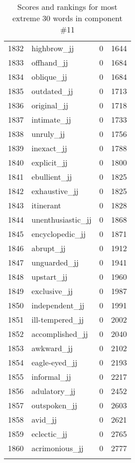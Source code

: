 \begin{longtable}[!htbp]{| rlr@{.}l |}
    1832 & highbrow\_jj & 0 & 1644 \\
    1833 & offhand\_jj & 0 & 1684 \\
    1834 & oblique\_jj & 0 & 1684 \\
    1835 & outdated\_jj & 0 & 1713 \\
    1836 & original\_jj & 0 & 1718 \\
    1837 & intimate\_jj & 0 & 1733 \\
    1838 & unruly\_jj & 0 & 1756 \\
    1839 & inexact\_jj & 0 & 1788 \\
    1840 & explicit\_jj & 0 & 1800 \\
    1841 & ebullient\_jj & 0 & 1825 \\
    1842 & exhaustive\_jj & 0 & 1825 \\
    1843 & itinerant & 0 & 1828 \\
    1844 & unenthusiastic\_jj & 0 & 1868 \\
    1845 & encyclopedic\_jj & 0 & 1871 \\
    1846 & abrupt\_jj & 0 & 1912 \\
    1847 & unguarded\_jj & 0 & 1941 \\
    1848 & upstart\_jj & 0 & 1960 \\
    1849 & exclusive\_jj & 0 & 1987 \\
    1850 & independent\_jj & 0 & 1991 \\
    1851 & ill-tempered\_jj & 0 & 2002 \\
    1852 & accomplished\_jj & 0 & 2040 \\
    1853 & awkward\_jj & 0 & 2102 \\
    1854 & eagle-eyed\_jj & 0 & 2193 \\
    1855 & informal\_jj & 0 & 2217 \\
    1856 & adulatory\_jj & 0 & 2452 \\
    1857 & outspoken\_jj & 0 & 2603 \\
    1858 & avid\_jj & 0 & 2621 \\
    1859 & eclectic\_jj & 0 & 2765 \\
    1860 & acrimonious\_jj & 0 & 2777 \\
    \hline
    \caption{Scores and rankings for most extreme 30 words in component \#11} \\
\end{longtable}
